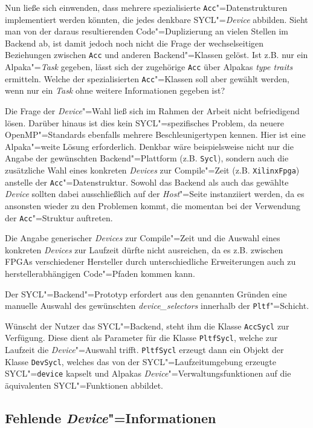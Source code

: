 Nun ließe sich einwenden, dass mehrere spezialisierte
\texttt{Acc}"=Datenstrukturen implementiert werden könnten, die jedes denkbare
SYCL"=\textit{Device} abbilden. Sieht man von der daraus resultierenden
Code"=Duplizierung an vielen Stellen im Backend ab, ist damit jedoch noch nicht
die Frage der wechselseitigen Beziehungen zwischen \texttt{Acc} und anderen
Backend"=Klassen gelöst. Ist z.B. nur ein Alpaka"=\textit{Task} gegeben, lässt
sich der zugehörige \texttt{Acc} über Alpakas \textit{type traits} ermitteln.
Welche der spezialisierten \texttt{Acc}"=Klassen soll aber gewählt werden, wenn
nur ein \textit{Task} ohne weitere Informationen gegeben ist?

Die Frage der \textit{Device}"=Wahl ließ sich im Rahmen der Arbeit nicht
befriedigend lösen. Darüber hinaus ist dies kein SYCL"=spezifisches Problem,
da neuere OpenMP"=Standards ebenfalls mehrere Beschleunigertypen kennen. Hier
ist eine Alpaka"=weite Lösung erforderlich. Denkbar wäre beispielsweise nicht
nur die Angabe der gewünschten Backend"=Plattform (z.B. \texttt{Sycl}), sondern
auch die zusätzliche Wahl eines konkreten \textit{Devices} zur Compile"=Zeit
(z.B. \texttt{XilinxFpga}) anstelle der \texttt{Acc}"=Datenstruktur. Sowohl das
Backend als auch das gewählte \textit{Device} sollten dabei ausschließlich auf
der \textit{Host}"=Seite instanziiert werden, da es ansonsten wieder zu den
Problemen kommt, die momentan bei der Verwendung der \texttt{Acc}"=Struktur
auftreten.

Die Angabe generischer \textit{Devices} zur Compile"=Zeit und die Auswahl eines
konkreten \textit{Devices} zur Laufzeit dürfte nicht ausreichen, da es z.B.
zwischen FPGAs verschiedener Hersteller durch unterschiedliche Erweiterungen
auch zu herstellerabhängigen Code"=Pfaden kommen kann.

Der SYCL"=Backend"=Prototyp erfordert aus den genannten Gründen eine manuelle
Auswahl des gewünschten \textit{device\_selectors} innerhalb der
\texttt{Pltf}"=Schicht.

Wünscht der Nutzer das SYCL"=Backend, steht ihm die Klasse \texttt{AccSycl} zur
Verfügung. Diese dient als Parameter für die Klasse \texttt{PltfSycl}, welche
zur Laufzeit die \textit{Device}"=Auswahl trifft. \texttt{PltfSycl} erzeugt
dann ein Objekt der Klasse \texttt{DevSycl}, welches das von der
SYCL"=Laufzeitumgebung erzeugte SYCL"=\texttt{device} kapselt und Alpakas
\textit{Device}"=Verwaltungsfunktionen auf die äquivalenten SYCL"=Funktionen
abbildet.

\subsection{Fehlende \textit{Device}"=Informationen}

